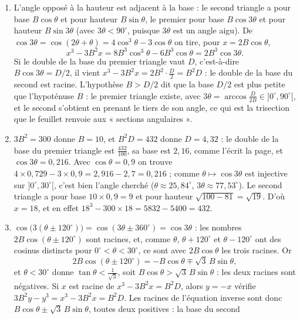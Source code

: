 \documentclass[11pt,a4paper]{article}
\begin{document}
\begin{solution}
\begin{enumerate}
\item L'angle opposé à la hauteur est adjacent à la base : le second triangle a
  pour base $B\cos\theta$ et pour hauteur $B\sin\theta$, le premier pour base
  $B\cos 3\theta$ et pour hauteur $B\sin 3\theta$ (avec $3\theta < 90^\circ$, puisque
  $3\theta$ est un angle aigu). De $\cos 3\theta = \cos(2\theta + \theta)
  = 4\cos^3\theta - 3\cos\theta$ on tire, pour $x = 2B\cos\theta$,
  \[
  x^3 - 3B^2x = 8B^3\cos^3\theta - 6B^3\cos\theta = 2B^3\cos 3\theta .
  \]
  Si le double de la base du premier triangle vaut $D$, c'est-à-dire
  $B\cos 3\theta = D/2$, il vient $x^3 - 3B^2x = 2B^2 \cdot \frac{D}{2} = B^2D$ :
  le double de la base du second est racine. L'hypothèse $B > D/2$ dit que la base
  $D/2$ est plus petite que l'hypoténuse $B$ : le premier triangle existe, avec
  $3\theta = \arccos\frac{D}{2B} \in {]0^\circ, 90^\circ[}$, et le second
  s'obtient en prenant le tiers de son angle, ce qui est la trisection que le
  feuillet renvoie aux « sections angulaires ».
\item $3B^2 = 300$ donne $B = 10$, et $B^2D = 432$ donne $D = 4{,}32$ : le double
  de la base du premier triangle est $\frac{432}{100}$, sa base est $2{,}16$, comme
  l'écrit la page, et $\cos 3\theta = 0{,}216$. Avec $\cos\theta = 0{,}9$ on trouve
  $4 \times 0{,}729 - 3 \times 0{,}9 = 2{,}916 - 2{,}7 = 0{,}216$ ; comme
  $\theta \mapsto \cos 3\theta$ est injective sur ${]0^\circ, 30^\circ[}$,
  c'est bien l'angle cherché ($\theta \approx 25{,}84^\circ$,
  $3\theta \approx 77{,}53^\circ$). Le second triangle a pour base $10 \times 0{,}9 = 9$
  et pour hauteur $\sqrt{100 - 81} = \sqrt{19}$. D'où $x = 18$, et en effet
  $18^3 - 300 \times 18 = 5832 - 5400 = 432$.
\item $\cos\bigl(3(\theta \pm 120^\circ)\bigr) = \cos(3\theta \pm 360^\circ)
  = \cos 3\theta$ : les nombres $2B\cos(\theta \pm 120^\circ)$ sont racines, et,
  comme $\theta$, $\theta + 120^\circ$ et $\theta - 120^\circ$ ont des cosinus
  distincts pour $0^\circ < \theta < 30^\circ$, ce sont avec $2B\cos\theta$ les trois
  racines. Or
  \[
  2B\cos(\theta \pm 120^\circ) = -B\cos\theta \mp \sqrt3\,B\sin\theta ,
  \]
  et $\theta < 30^\circ$ donne $\tan\theta < \frac{1}{\sqrt3}$, soit
  $B\cos\theta > \sqrt3\,B\sin\theta$ : les deux racines sont négatives. Si $x$ est
  racine de $x^3 - 3B^2x = B^2D$, alors $y = -x$ vérifie
  $3B^2y - y^3 = x^3 - 3B^2x = B^2D$. Les racines de l'équation inverse sont donc
  $B\cos\theta \pm \sqrt3\,B\sin\theta$, toutes deux positives : la base du second

\end{enumerate}
\end{solution}
\end{document}
